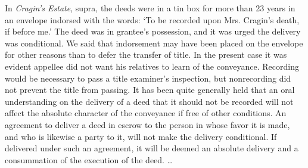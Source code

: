 In \textit{Cragin's Estate}, supra, the deeds were in a tin box for more than 23
years in an envelope indorsed with the words: `To be recorded upon Mrs.
Cragin's death, if before me.' The deed was in grantee's possession, and it was
urged the delivery was conditional. We said that indorsement may have been
placed on the envelope for other reasons than to defer the transfer of title.
In the present case it was evident appellee did not want his relatives to learn
of the conveyance. Recording would be necessary to pass a title examiner's
inspection, but nonrecording did not prevent the title from passing. It has
been quite generally held that an oral understanding on the delivery of a deed
that it should not be recorded will not affect the absolute character of the
conveyance if free of other conditions. An agreement to deliver a deed in escrow
to the person in whose favor it is made, and who is likewise a party to it,
will not make the delivery conditional. If delivered under such an agreement,
it will be deemed an absolute delivery and a consummation of the execution of
the deed. \dots{}

